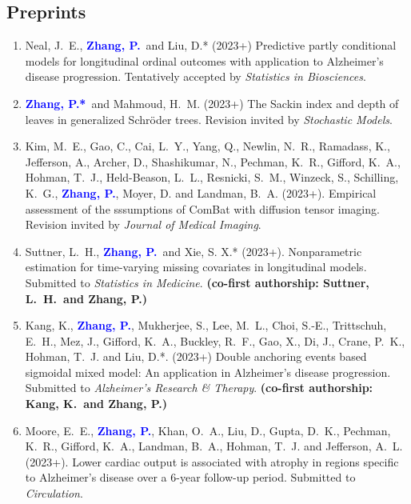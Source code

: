 \documentclass[12pt]{article}
\newcommand{\PZ}{\textcolor{blue}{\textbf{Zhang, P.*}}}
\newcommand{\PZnot}{\textcolor{blue}{\textbf{Zhang, P.}}}
\begin{document}
	\subsection*{Preprints}
	\begin{enumerate}	
		\item {\sc Neal, J.\ E.}, \PZnot\ and {\sc Liu, D.*} (2023+) 
		Predictive partly conditional models for longitudinal 
		ordinal outcomes with application to Alzheimer's disease
		progression. Tentatively accepted by {\em Statistics in 
		Biosciences}.
		
		\item \PZ\ and {\sc Mahmoud, H.\ M.} (2023+) The Sackin 
		index and depth of leaves in generalized Schr\"{o}der trees. 
		Revision invited by {\em Stochastic Models}.

		\item {\sc Kim, M.\ E., Gao, C., Cai, L.\ Y., Yang, Q., 
		Newlin, N.\ R., Ramadass, K., Jefferson, A., Archer, D., 
		Shashikumar, N., Pechman, K.\ R., Gifford, K.\ A., Hohman, 
		T.\ J., Held-Beason, L.\ L., Resnicki, S.\ M., Winzeck, S., 
		Schilling, K.\ G.,} \PZnot, {\sc Moyer, D.} and {\sc 
		Landman, B.\ A.} (2023+). Empirical assessment of the 
		sssumptions of ComBat with diffusion tensor imaging. 
		Revision invited by {\em Journal of Medical Imaging}.
				
		\item {\sc Suttner, L.\ H.,} \PZnot\ and {\sc Xie, S. X.*} 
		(2023+). Nonparametric estimation for time-varying missing 
		covariates in longitudinal models. Submitted to {\em 
		Statistics in Medicine}. {\bf (co-first authorship: Suttner, 
		L.\ H.\ and Zhang, P.)}
	
		\item {\sc Kang, K.}, \PZnot, {\sc Mukherjee, S., Lee, M.\ 
		L., Choi, S.-E., Trittschuh, E.\ H., Mez, J., Gifford, K.\ 
		A., Buckley, R.\ F., Gao, X., Di, J., Crane, P.\ K., Hohman, 
		T.\ J.} and {\sc Liu, D.*}. (2023+) Double anchoring events 
		based sigmoidal mixed model: An application in Alzheimer's 
		disease progression. Submitted to {\em Alzheimer's Research 
		\& Therapy}. {\bf (co-first authorship: Kang, K.\ and Zhang, 
		P.)}
		
		\item {\sc Moore, E.\ E.,} \PZnot, {\sc Khan, O.\ A., Liu, 
		D., Gupta, D.\ K., Pechman, K.\ R., Gifford, K.\ A., 
		Landman, B.\ A., Hohman, T.\ J.} and {\sc Jefferson, A.\ 
		L.} (2023+). Lower cardiac output is associated with atrophy 
		in regions specific to Alzheimer’s disease over a 6-year 
		follow-up period. Submitted to {\em Circulation}.
		

\end{enumerate}
\end{document}
